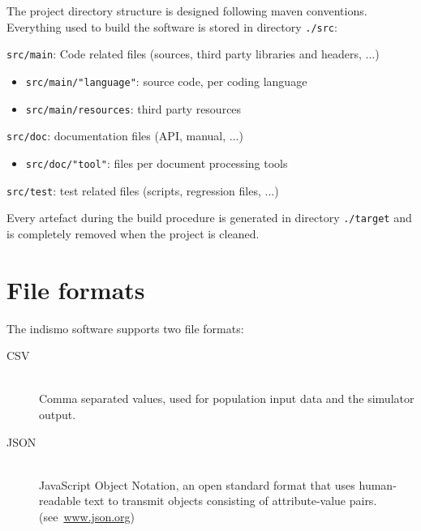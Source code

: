 The project directory structure is designed following maven conventions.
Everything used to build the software is stored in directory \texttt{./src}:
\begin{compactitem}
    \item \texttt{src/main}: Code related files (sources, third party libraries and headers, ...)
      	\begin{itemize}
        		\item \texttt{src/main/"language"}: source code, per coding language 
        		\item \texttt{src/main/resources}: third party resources
        \end{itemize}
    \item \texttt{src/doc}: documentation files (API, manual, ...)
      	\begin{itemize}
        		\item \texttt{src/doc/"tool"}: files per document processing tools
        \end{itemize}
    \item \texttt{src/test}: test related files (scripts, regression files, ...)
\end{compactitem}
Every artefact during the build procedure is generated in directory \texttt{./target} and is completely removed when the project is cleaned.

\section{File formats}
\label{section:FileFormats}

The indismo software supports two file formats: 
\begin{description}
	\item [CSV] \ \\
	Comma separated values, used for population input data and the simulator output.
	\item [JSON] \ \\
	JavaScript Object Notation, an open standard format that uses human-readable text to transmit objects consisting of attribute-value pairs. 	 \mbox{(see \url{www.json.org})}
\end{description}


%
